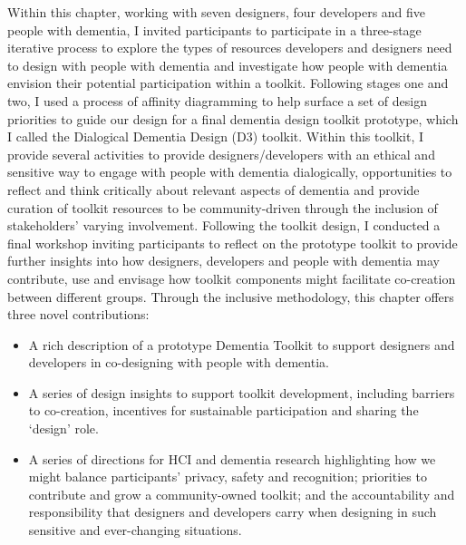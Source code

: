 Within this chapter, working with seven designers, four developers and five people with dementia, I invited participants to participate in a three-stage iterative process to explore the types of resources developers and designers need to design with people with dementia and investigate how people with dementia envision their potential participation within a toolkit. Following stages one and two, I used a process of affinity diagramming to help surface a set of design priorities to guide our design for a final dementia design toolkit prototype, which I called the Dialogical Dementia Design (D3) toolkit. Within this toolkit, I provide several activities to provide designers/developers with an ethical and sensitive way to engage with people with dementia dialogically, opportunities to reflect and think critically about relevant aspects of dementia and provide curation of toolkit resources to be community-driven through the inclusion of stakeholders' varying involvement. Following the toolkit design, I conducted a final workshop inviting participants to reflect on the prototype toolkit to provide further insights into how designers, developers and people with dementia may contribute, use and envisage how toolkit components might facilitate co-creation between different groups. Through the inclusive methodology, this chapter offers three novel contributions:

\begin{itemize}
    \item  A rich description of a prototype Dementia Toolkit to support designers and developers in co-designing with people with dementia.
    \item  A series of design insights to support toolkit development, including barriers to co-creation, incentives for sustainable participation and sharing the `design' role.
    \item A series of directions for HCI and dementia research highlighting how we might balance participants' privacy, safety and recognition; priorities to contribute and grow a community-owned toolkit; and the accountability and responsibility that designers and developers carry when designing in such sensitive and ever-changing situations.
\end{itemize}


